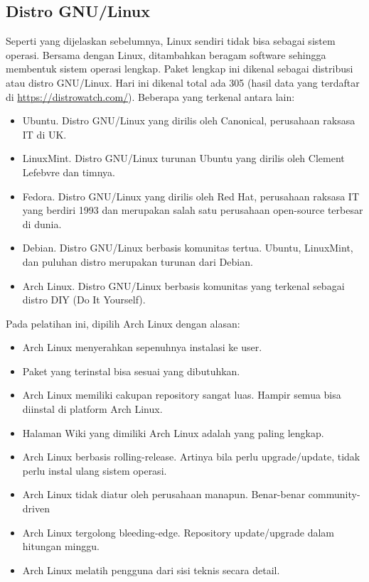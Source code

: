 \documentclass[12pt,]{article}
\begin{document}
	\subsection{Distro GNU/Linux}
	Seperti yang dijelaskan sebelumnya, Linux sendiri tidak bisa sebagai sistem operasi.
	Bersama dengan Linux, ditambahkan beragam software sehingga membentuk sistem operasi lengkap.
	Paket lengkap ini dikenal sebagai distribusi atau distro GNU/Linux.
	Hari ini dikenal total ada 305 (hasil data yang terdaftar di \url{https://distrowatch.com/}).
	Beberapa yang terkenal antara lain:
	\begin{itemize}
		\item Ubuntu. Distro GNU/Linux yang dirilis oleh Canonical, perusahaan raksasa IT di UK.
		\item LinuxMint. Distro GNU/Linux turunan Ubuntu yang dirilis oleh Clement Lefebvre dan timnya.
		\item Fedora. Distro GNU/Linux yang dirilis oleh Red Hat,
		perusahaan raksasa IT yang berdiri 1993 dan merupakan salah satu perusahaan open-source terbesar di dunia.
		\item Debian. Distro GNU/Linux berbasis komunitas tertua. Ubuntu, LinuxMint, dan puluhan distro merupakan turunan dari Debian.
		\item Arch Linux. Distro GNU/Linux berbasis komunitas yang terkenal sebagai distro DIY (Do It Yourself).
	\end{itemize}
	
	Pada pelatihan ini, dipilih Arch Linux dengan alasan:
	\begin{itemize}
		\item Arch Linux menyerahkan sepenuhnya instalasi ke user.
		\item Paket yang terinstal bisa sesuai yang dibutuhkan. 
		\item Arch Linux memiliki cakupan repository sangat luas.
		Hampir semua bisa diinstal di platform Arch Linux.
		\item Halaman Wiki yang dimiliki Arch Linux adalah yang paling lengkap.
		\item Arch Linux berbasis rolling-release.
		Artinya bila perlu upgrade/update, tidak perlu instal ulang sistem operasi.
		\item Arch Linux tidak diatur oleh perusahaan manapun. 
		Benar-benar community-driven
		\item Arch Linux tergolong bleeding-edge. Repository update/upgrade dalam hitungan minggu.
		\item Arch Linux melatih pengguna dari sisi teknis secara detail.
	\end{itemize}
\end{document}
